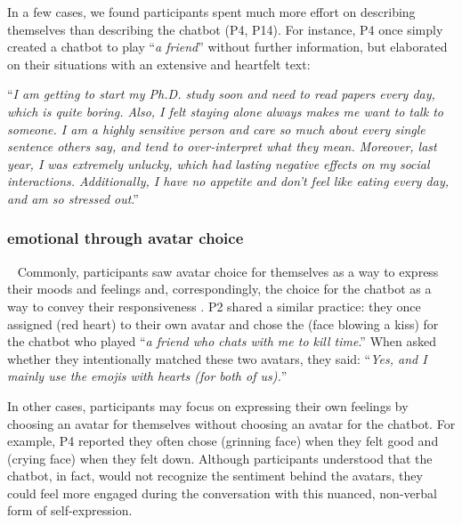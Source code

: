 In a few cases, we found participants spent much more effort on describing themselves than describing the chatbot (P4, P14). For instance, P4 once simply created a chatbot to play ``\textit{a friend}'' without further information, but elaborated on their situations with an extensive and heartfelt text:

``\textit{I am getting to start my Ph.D. study soon and need to read papers every day, which is quite boring. Also, I felt staying alone always makes me want to talk to someone. I am a highly sensitive person and care so much about every single sentence others say, and tend to over-interpret what they mean. Moreover, last year, I was extremely unlucky, which had lasting negative effects on my social interactions. Additionally, I have no appetite and don't feel like eating every day, and am so stressed out}.''

\subsubsection{ emotional  through avatar choice}~\label{emotional-dynamics}
Commonly, participants saw avatar choice for themselves as a way to express their moods and feelings and, correspondingly, the choice for the chatbot as a way to convey their responsiveness . 
P2 shared a similar practice: they once assigned  (red heart) to their own avatar and chose the  (face blowing a kiss) for the chatbot who played ``\textit{a friend who chats with me to kill time}.'' When asked whether they intentionally matched these two avatars, they said:
``\textit{Yes, and I mainly use the emojis with hearts (for both of us).}'' 

In other cases, participants may focus on expressing their own feelings by choosing an avatar for themselves without choosing an avatar for the chatbot. For example, P4 reported they often chose  (grinning face) when they felt good and  (crying face) when they felt down. 
Although participants understood that the chatbot, in fact, would not recognize the sentiment behind the avatars, they could feel more engaged during the conversation with this nuanced, non-verbal form of self-expression.


